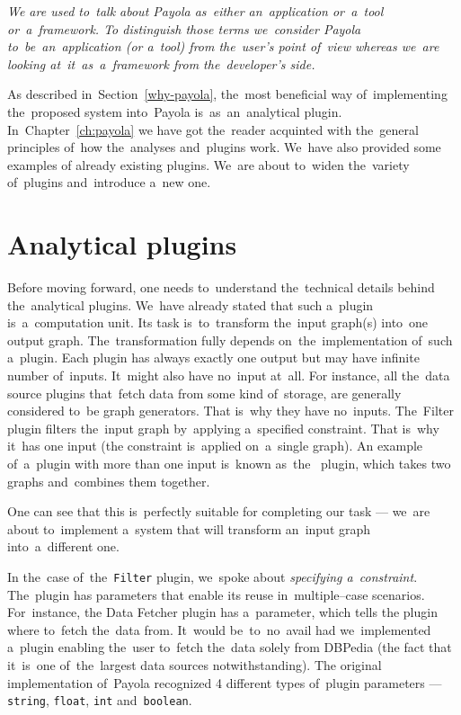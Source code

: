 \emph{We are used to~talk about Payola as~either an~application or~a~tool or~a~framework. To
distinguish those terms we~consider Payola to~be~an~application (or a~tool) from the~user’s
point of~view whereas we~are looking at~it~as~a~framework from the~developer’s side.}

As described in~Section~\ref{why-payola}, the~most beneficial way of~implementing the~proposed system into~Payola is~as~an~analytical plugin. In~Chapter~\ref{ch:payola}
we have got the~reader acquinted with the~general principles of~how the~analyses and~plugins work. We~have also provided some examples 
of already existing plugins. We~are about to~widen the~variety of~plugins and~introduce a~new one.

\section{Analytical plugins}
Before moving forward, one needs to~understand the~technical 
details behind the~analytical plugins. We~have already stated that such a~plugin is~a~computation unit. Its task is~to~transform the~input graph(s) into~one output 
graph. The~transformation fully depends on~the~implementation of~such a~plugin. Each plugin has always exactly one output but may have infinite number of~inputs. It~might also have no~input at~all. For instance, all the~data 
source plugins that~fetch data from some kind of~storage, are generally considered to~be
graph generators. That is~why they have no~inputs. The~Filter 
plugin filters the~input graph by~applying a~specified constraint. That is~why it~has one input (the constraint is~applied on~a~single graph).
An example of~a~plugin with more than one input is~known as~the~ 
plugin, which takes two graphs and~combines them together.

One can see that this is~perfectly suitable for completing our task --- we~are about to~implement a~system that will transform an~input graph into~a~different one.

In the~case of~the~\texttt{Filter} plugin, we~spoke about \emph{specifying a~constraint}. The~plugin has parameters that enable its reuse in~multiple--case scenarios. For~instance,
the Data Fetcher plugin has a~parameter, which tells 
the plugin where to~fetch the~data from. It~would be~to~no~avail had we~implemented a~plugin
enabling the~user to~fetch the~data solely from DBPedia (the fact that it~is~one of~the~largest data
sources notwithstanding).
The original implementation of~Payola recognized 4 different types of~plugin 
parameters --- \texttt{string}, \texttt{float}, \texttt{int} and~\texttt{boolean}. 

